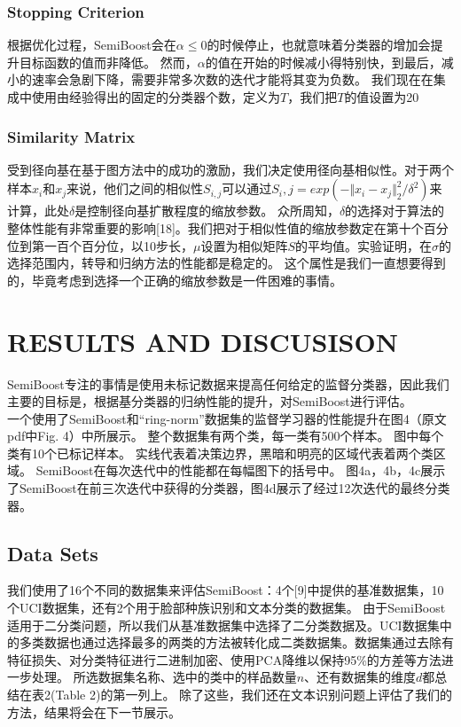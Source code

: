 \documentclass[10pt,journal,compsoc]{IEEEtran}
\begin{document}
\subsubsection{Stopping Criterion}
根据优化过程，SemiBoost会在$\alpha\leq0$的时候停止，也就意味着分类器的增加会提升目标函数的值而非降低。
然而，$\alpha$的值在开始的时候减小得特别快，到最后，减小的速率会急剧下降，需要非常多次数的迭代才能将其变为负数。
我们现在在集成中使用由经验得出的固定的分类器个数，定义为$T$，我们把$T$的值设置为20

\subsubsection{Similarity Matrix}
受到径向基在基于图方法中的成功的激励，我们决定使用径向基相似性。对于两个样本$x_i$和$x_j$来说，他们之间的相似性$S_{i,j}$可以通过$S_i,j=exp(-\Vert x_i - x_j\Vert^2_2/\delta^2)$来计算，此处$\delta$是控制径向基扩散程度的缩放参数。
众所周知，$\delta$的选择对于算法的整体性能有非常重要的影响[18]。我们把对于相似性值的缩放参数定在第十个百分位到第一百个百分位，以10步长，$\mu$设置为相似矩阵$S$的平均值。实验证明，在$\sigma$的选择范围内，转导和归纳方法的性能都是稳定的。
这个属性是我们一直想要得到的，毕竟考虑到选择一个正确的缩放参数是一件困难的事情。

\section{RESULTS AND DISCUSISON}
SemiBoost专注的事情是使用未标记数据来提高任何给定的监督分类器，因此我们主要的目标是，根据基分类器的归纳性能的提升，对SemiBoost进行评估。\\

一个使用了SemiBoost和“ring-norm”数据集的监督学习器的性能提升在图4（原文pdf中Fig. 4）中所展示。
整个数据集有两个类，每一类有500个样本。
图中每个类有10个已标记样本。
实线代表着决策边界，黑暗和明亮的区域代表着两个类区域。
SemiBoost在每次迭代中的性能都在每幅图下的括号中。
图4a，4b，4c展示了SemiBoost在前三次迭代中获得的分类器，图4d展示了经过12次迭代的最终分类器。

\subsection{Data Sets}
我们使用了16个不同的数据集来评估SemiBoost：4个[9]中提供的基准数据集，10个UCI数据集，还有2个用于脸部种族识别和文本分类的数据集。
由于SemiBoost适用于二分类问题，所以我们从基准数据集中选择了二分类数据及。UCI数据集中的多类数据也通过选择最多的两类的方法被转化成二类数据集。数据集通过去除有特征损失、对分类特征进行二进制加密、使用PCA降维以保持95\%的方差等方法进一步处理。
所选数据集名称、选中的类中的样品数量$n$、还有数据集的维度$d$都总结在表2(Table 2)的第一列上。
除了这些，我们还在文本识别问题上评估了我们的方法，结果将会在下一节展示。\\
\end{document}
